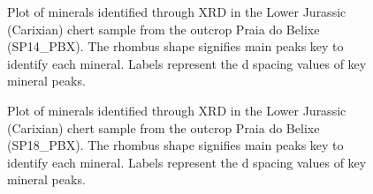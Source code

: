 \documentclass[
  a4paper,
  DIV=11,
  numbers=noendperiod]{scrreprt}
\begin{document}
\begin{figure}


\caption{\label{fig-xrd-sp14}Plot of minerals identified through XRD in
the Lower Jurassic (Carixian) chert sample from the outcrop Praia do
Belixe (SP14\_PBX). The rhombus shape signifies main peaks key to
identify each mineral. Labels represent the d spacing values of key
mineral peaks.}

\end{figure}%

\begin{figure}


\caption{\label{fig-xrd-sp18}Plot of minerals identified through XRD in
the Lower Jurassic (Carixian) chert sample from the outcrop Praia do
Belixe (SP18\_PBX). The rhombus shape signifies main peaks key to
identify each mineral. Labels represent the d spacing values of key
mineral peaks.}

\end{figure}%
\end{document}

